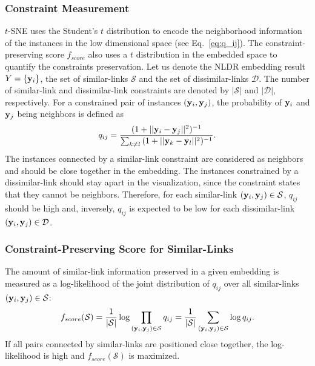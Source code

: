 \subsubsection*{Constraint Measurement}
$t$-SNE uses the Student's $t$ distribution to encode the neighborhood information of the instances in the low dimensional space (see Eq.~\ref{eq:q_ij}).
The constraint-preserving score $f_{score}$ also uses a $t$ distribution in the embedded space to quantify the constraints preservation.
Let us denote the NLDR embedding result ${Y} = \{{{\bf y}_i}\}$, the set of similar-links $\mathcal{S}$ and the set of dissimilar-links $\mathcal{D}$. The number of similar-link and dissimilar-link constraints are denoted by $|\mathcal{S}|$ and $|\mathcal{D}|$, respectively.
For a constrained pair of instances $({\bf y}_i, {\bf y}_j)$, the probability of ${\bf y}_i$ and ${\bf y}_j$ being neighbors is defined as
\begin{equation}\label{equ:q_link}
    q_{ij} = \frac
    { ( 1 + || {\bf y}_i - {\bf y}_j ||^2 )^{-1} }
    { \sum_{k \neq l} { ( 1 + ||{\bf y}_k - {\bf y}_l||^2 )^{-1} } }.
\end{equation}
The instances connected by a similar-link constraint are considered as neighbors and should be close together in the embedding.
The instances constrained by a dissimilar-link should stay apart in the visualization, since the constraint states that they cannot be neighbors.
Therefore, for each similar-link $({\bf y}_i, {\bf y}_j) \in \mathcal{S}$, $q_{ij}$ should be high and, inversely, $q_{ij}$ is expected to be low for each dissimilar-link $({\bf y}_i, {\bf y}_j) \in \mathcal{D}$.

\subsubsection*{Constraint-Preserving Score for Similar-Links}
The amount of similar-link information preserved in a given embedding is measured as a log-likelihood of the joint distribution of $q_{i j}$ over all similar-links $({\bf y}_i, {\bf y}_j) \in \mathcal{S}$:
\begin{equation}
f_{score}(\mathcal{S}) = \frac{1}{|\mathcal{S}|} \log \prod_{({\bf y}_i, {\bf y}_j) \in \mathcal{S}} q_{ij}
                = \frac{1}{|\mathcal{S}|} \sum_{({\bf y}_i, {\bf y}_j) \in \mathcal{S}} \log q_{ij}.
\end{equation}
If all pairs connected by similar-links are positioned close together, the log-likelihood is high and $f_{score}(\mathcal{S})$ is maximized.

